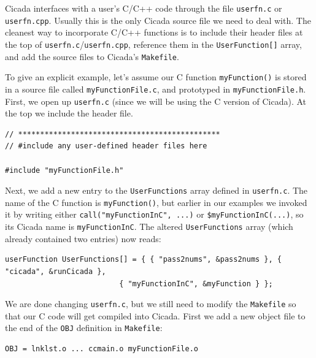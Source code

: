 \documentclass{article}
\newenvironment{code}{
       \begin{list}{}{
               \setlength{\leftmargin}{.4in}
               \setlength{\rightmargin}{0in}
               \setlength{\topsep}{.2in}
       }
       \small
       \item[] }
       { \end{list}   }
\begin{document}
Cicada interfaces with a user's C/C++ code through the file \verb#userfn.c# or \verb#userfn.cpp#.  Usually this is the only Cicada source file we need to deal with.  The cleanest way to incorporate C/C++ functions is to include their header files at the top of \verb#userfn.c#/\verb#userfn.cpp#, reference them in the \verb#UserFunction[]# array, and add the source files to Cicada's \verb#Makefile#.

To give an explicit example, let's assume our C function \verb#myFunction()# is stored in a source file called \verb#myFunctionFile.c#, and prototyped in \verb#myFunctionFile.h#.  First, we open up \verb#userfn.c# (since we will be using the C version of Cicada).  At the top we include the header file.

\begin{code} \begin{verbatim}
// **********************************************
// #include any user-defined header files here

#include "myFunctionFile.h"
\end{verbatim} \end{code}

Next, we add a new entry to the \verb#UserFunctions# array defined in \verb#userfn.c#.  The name of the C function is \verb#myFunction()#, but earlier in our examples we invoked it by writing either \verb#call("myFunctionInC", ...)# or \verb#$myFunctionInC(...)#, so its Cicada name is \verb#myFunctionInC#.  The altered \verb#UserFunctions# array (which already contained two entries) now reads:

\begin{code} \begin{verbatim}
userFunction UserFunctions[] = { { "pass2nums", &pass2nums }, { "cicada", &runCicada },
                          { "myFunctionInC", &myFunction } };
\end{verbatim} \end{code}

We are done changing \verb#userfn.c#, but we still need to modify the \verb#Makefile# so that our C code will get compiled into Cicada.  First we add a new object file to the end of the \verb#OBJ# definition in \verb#Makefile#:

\begin{code} \begin{verbatim}
OBJ = lnklst.o ... ccmain.o myFunctionFile.o
\end{verbatim} \end{code}
\end{document}

